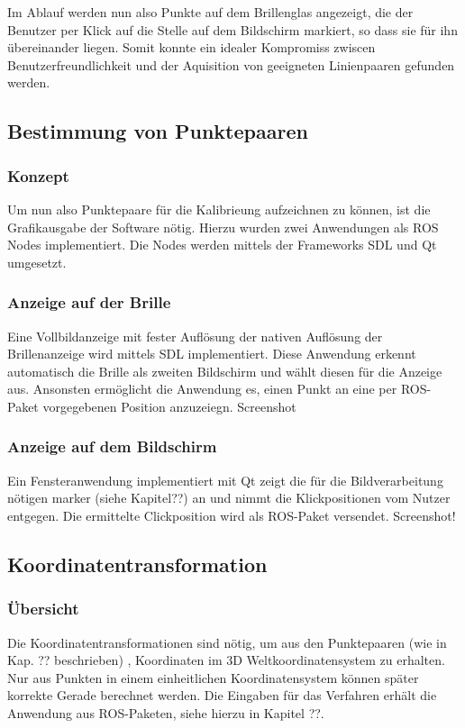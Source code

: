     Im Ablauf werden nun also Punkte auf dem Brillenglas angezeigt, die der Benutzer per Klick auf die Stelle auf dem Bildschirm markiert, so dass sie für ihn übereinander liegen. Somit konnte ein idealer Kompromiss zwiscen Benutzerfreundlichkeit und der Aquisition von geeigneten Linienpaaren gefunden werden.


\subsection{Bestimmung von Punktepaaren}
\subsubsection{Konzept}
Um nun also Punktepaare für die Kalibrieung aufzeichnen zu können, ist die Grafikausgabe der Software nötig. Hierzu wurden zwei Anwendungen als ROS Nodes implementiert. Die Nodes werden mittels der Frameworks SDL und Qt umgesetzt.
\subsubsection{Anzeige auf der Brille}
Eine Vollbildanzeige mit fester Auflösung der nativen Auflösung der Brillenanzeige wird mittels SDL implementiert. Diese Anwendung erkennt automatisch die Brille als zweiten Bildschirm und wählt diesen für die Anzeige aus. Ansonsten ermöglicht die Anwendung es, einen Punkt an eine per ROS-Paket vorgegebenen Position anzuzeiegn.
Screenshot
\subsubsection{Anzeige auf dem Bildschirm}
Ein Fensteranwendung implementiert mit Qt zeigt die für die Bildverarbeitung nötigen marker (siehe Kapitel??) an und nimmt die Klickpositionen vom Nutzer entgegen. Die ermittelte Clickposition wird als ROS-Paket versendet.
Screenshot!


\subsection{Koordinatentransformation}
\subsubsection{Übersicht}
Die Koordinatentransformationen sind nötig, um aus den Punktepaaren (wie in Kap. ?? beschrieben) , Koordinaten im 3D Weltkoordinatensystem zu erhalten. Nur aus Punkten in einem einheitlichen Koordinatensystem können später korrekte Gerade berechnet werden.
Die Eingaben für das Verfahren erhält die Anwendung aus ROS-Paketen, siehe hierzu in Kapitel ??.
